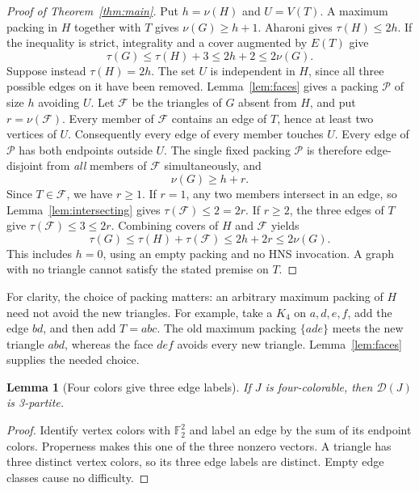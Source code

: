 \documentclass[11pt]{article}
\newtheorem{lemma}[theorem]{Lemma}
\newcommand{\D}{\mathcal D}
\begin{document}
\begin{proof}[Proof of Theorem~\ref{thm:main}]
Put $h=\nu(H)$ and $U=V(T)$. A maximum packing in $H$ together with
$T$ gives $\nu(G)\ge h+1$. Aharoni gives $\tau(H)\le2h$.
If the inequality is strict, integrality and a cover augmented by $E(T)$ give
\begin{equation}\label{eq:strict}
\tau(G)\le\tau(H)+3\le2h+2\le2\nu(G).
\end{equation}
Suppose instead $\tau(H)=2h$. The set $U$ is independent in $H$, since
all three possible edges on it have been removed. Lemma~\ref{lem:faces}
gives a packing $\mathcal P$ of size $h$ avoiding $U$.
Let $\mathcal F$ be the triangles of $G$ absent from $H$, and put
$r=\nu(\mathcal F)$. Every member of $\mathcal F$ contains an edge of
$T$, hence at least two vertices of $U$. Consequently every edge of
every member touches $U$. Every edge of $\mathcal P$ has both endpoints
outside $U$. The single fixed packing $\mathcal P$ is therefore
edge-disjoint from \emph{all} members of $\mathcal F$ simultaneously, and
\begin{equation}\label{eq:simultaneous}
\nu(G)\ge h+r.
\end{equation}
Since $T\in\mathcal F$, we have $r\ge1$. If $r=1$, any two members
intersect in an edge, so Lemma~\ref{lem:intersecting} gives
$\tau(\mathcal F)\le2=2r$. If $r\ge2$, the three edges of $T$ give
$\tau(\mathcal F)\le3\le2r$. Combining covers of $H$ and $\mathcal F$ yields
\begin{equation}\label{eq:equality}
\tau(G)\le\tau(H)+\tau(\mathcal F)\le2h+2r\le2\nu(G).
\end{equation}
This includes $h=0$, using an empty packing and no HNS invocation. A graph
with no triangle cannot satisfy the stated premise on $T$.
\end{proof}

For clarity, the choice of packing matters: an arbitrary maximum packing
of $H$ need not avoid the new triangles. For example, take a $K_4$ on
$a,d,e,f$, add the edge $bd$, and then add $T=abc$. The old maximum
packing $\{ade\}$ meets the new triangle $abd$, whereas the face $def$
avoids every new triangle. Lemma~\ref{lem:faces} supplies the needed choice.

\begin{lemma}[Four colors give three edge labels]\label{lem:colors}
If $J$ is four-colorable, then $\D(J)$ is 3-partite.
\end{lemma}
\begin{proof}
Identify vertex colors with $\mathbb F_2^2$ and label an edge by the
sum of its endpoint colors. Properness makes this one of the three
nonzero vectors. A triangle has three distinct vertex colors, so its
three edge labels are distinct. Empty edge classes cause no difficulty.
\end{proof}
\end{document}
